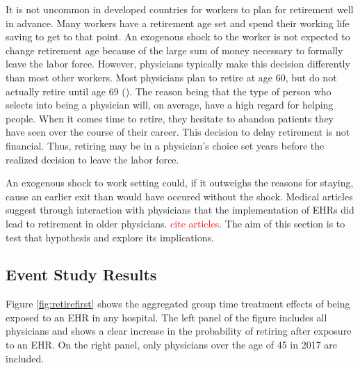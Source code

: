 \documentclass[11pt]{article}
\begin{document}
It is not uncommon in developed countries for workers to plan for retirement well in advance. Many workers have a retirement age set and spend their working life saving to get to that point. An exogenous shock to the worker is not expected to change retirement age because of the large sum of money necessary to formally leave the labor force. However, physicians typically make this decision differently than most other workers. Most physicians plan to retire at age 60, but do not actually retire until age 69 (\cite{collier2017challenges}). The reason being that the type of person who selects into being a physician will, on average, have a high regard for helping people. When it comes time to retire, they hesitate to abandon patients they have seen over the course of their career. This decision to delay retirement is not financial. Thus, retiring may be in a physician's choice set years before the realized decision to leave the labor force. 

An exogenous shock to work setting could, if it outweighs the reasons for staying, cause an earlier exit than would have occured without the shock. Medical articles suggest through interaction with physicians that the implementation of EHRs did lead to retirement in older physicians. \textcolor{red}{cite articles}. The aim of this section is to test that hypothesis and explore its implications. 

\subsection{Event Study Results}

Figure \ref{fig:retirefirst} shows the aggregated group time treatment effects of being exposed to an EHR in any hospital. The left panel of the figure includes all physicians and shows a clear increase in the probability of retiring after exposure to an EHR. On the right panel, only physicians over the age of 45 in 2017 are included. 
\end{document}
